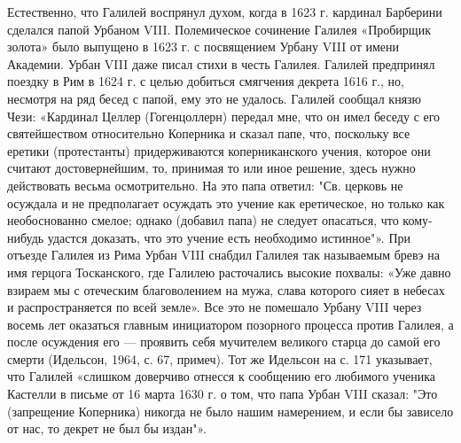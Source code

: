 Естественно, что  Галилей воспрянул  духом, когда  в 1623  г. кардинал
Барберини сделался папой Урбаном  VIII. Полемическое сочинение Галилея
«Пробирщик золота» было  выпущено в 1623 г. с  посвящением Урбану VIII
от  имени Академии.  Урбан  VIII  даже писал  стихи  в честь  Галилея.
Галилей  предпринял  поездку  в  Рим   в  1624  г.  с  целью  добиться
смягчения  декрета  1616  г.,  но,  несмотря на  ряд  бесед  с  папой,
ему  это не  удалось.  Галилей сообщал  князю  Чези: «Кардинал  Целлер
(Гогенцоллерн) передал  мне, что  он имел  беседу с  его святейшеством
относительно  Коперника  и сказал  папе,  что,  поскольку все  еретики
(протестанты)  придерживаются  коперниканского   учения,  которое  они
считают  достовернейшим,  то,  принимая  то или  иное  решение,  здесь
нужно  действовать весьма  осмотрительно.  На это  папа ответил:  "Св.
церковь  не  осуждала  и  не  предполагает  осуждать  это  учение  как
еретическое, но только как необоснованно смелое; однако (добавил папа)
не следует опасаться, что кому-нибудь удастся доказать, что это учение
есть необходимо  истинное"». При  отъезде Галилея  из Рима  Урбан VIII
снабдил  Галилея  так называемым  бревэ  на  имя герцога  Тосканского,
где  Галилею расточались  высокие  похвалы: «Уже  давно  взираем мы  с
отеческим  благоволением на  мужа, слава  которого сияет  в небесах  и
распространяется по всей земле». Все это не помешало Урбану VIII через
восемь  лет оказаться  главным инициатором  позорного процесса  против
Галилея, а  после осуждения его  --- проявить себя  мучителем великого
старца до  самой его смерти  (Идельсон, 1964,  с. 67, примеч).  Тот же
Идельсон на с. 171 указывает, что Галилей «слишком доверчиво отнесся к
сообщению его любимого ученика Кастелли в письме от 16 марта 1630 г. о
том, что папа  Урбан VIII сказал: "Это  (запрещение Коперника) никогда
не было нашим намерением, и если бы  зависело от нас, то декрет не был
бы издан"».

